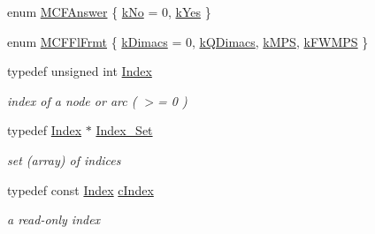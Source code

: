 \begin{Indent}
\begin{DoxyCompactItemize}
enum \mbox{\hyperlink{class_m_c_f_class_ad7b7f4459be059eae1a7d83a8e190c28}{M\+C\+F\+Answer}} \{ \mbox{\hyperlink{class_m_c_f_class_ad7b7f4459be059eae1a7d83a8e190c28a503f4e9dca6c8c12ea38f9e8c1be0126}{k\+No}} = 0, 
\mbox{\hyperlink{class_m_c_f_class_ad7b7f4459be059eae1a7d83a8e190c28ace5b3b5f2037b0d65d161b53b7c940fe}{k\+Yes}}
 \}
\item 
enum \mbox{\hyperlink{class_m_c_f_class_adb1b139bac65f5f35bdadc7549a819de}{M\+C\+F\+Fl\+Frmt}} \{ \mbox{\hyperlink{class_m_c_f_class_adb1b139bac65f5f35bdadc7549a819dea6e65d07cdd719be7d99902bb47920a37}{k\+Dimacs}} = 0, 
\mbox{\hyperlink{class_m_c_f_class_adb1b139bac65f5f35bdadc7549a819deac27a029d7010490d53e1df36b39597e6}{k\+Q\+Dimacs}}, 
\mbox{\hyperlink{class_m_c_f_class_adb1b139bac65f5f35bdadc7549a819dea65125719fd6c68bc3904a45937fcfd85}{k\+M\+PS}}, 
\mbox{\hyperlink{class_m_c_f_class_adb1b139bac65f5f35bdadc7549a819dea7efb98d1b3dfca0f601d4df644b418a0}{k\+F\+W\+M\+PS}}
 \}
\item 
\mbox{\label{class_m_c_f_class_ad53d6229d7ec28555a9c9c2fd9abf773}} 
typedef unsigned int \mbox{\hyperlink{class_m_c_f_class_ad53d6229d7ec28555a9c9c2fd9abf773}{Index}}
\begin{DoxyCompactList}\small\item\em index of a node or arc ( $>$= 0 ) \end{DoxyCompactList}\item 
\mbox{\label{class_m_c_f_class_ace3388eb329ff0551a0b86b6c67e33d8}} 
typedef \mbox{\hyperlink{class_m_c_f_class_ad53d6229d7ec28555a9c9c2fd9abf773}{Index}} $\ast$ \mbox{\hyperlink{class_m_c_f_class_ace3388eb329ff0551a0b86b6c67e33d8}{Index\+\_\+\+Set}}
\begin{DoxyCompactList}\small\item\em set (array) of indices \end{DoxyCompactList}\item 
\mbox{\label{class_m_c_f_class_a76aaabb20535c51a2752b93f6c38fe54}} 
typedef const \mbox{\hyperlink{class_m_c_f_class_ad53d6229d7ec28555a9c9c2fd9abf773}{Index}} \mbox{\hyperlink{class_m_c_f_class_a76aaabb20535c51a2752b93f6c38fe54}{c\+Index}}
\begin{DoxyCompactList}\small\item\em a read-\/only index \end{DoxyCompactList}\item 

\end{DoxyCompactItemize}
\end{Indent}
